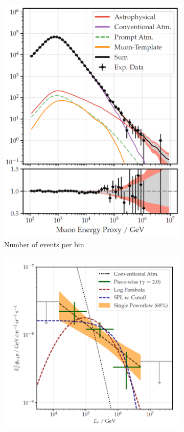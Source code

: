 \begin{figure}
    \centering
    \begin{subfigure}[b]{0.35\textwidth}
        \centering
        \includegraphics[width=\textwidth]{Ice_cube_flux_tot.png}
        \caption{Number of events per bin}
    \end{subfigure}%
    \begin{subfigure}[b]{0.5\textwidth}
        \centering
        \includegraphics[width=\textwidth]{Ice_cube_flux_astro.png}

\end{subfigure}
\end{figure}
